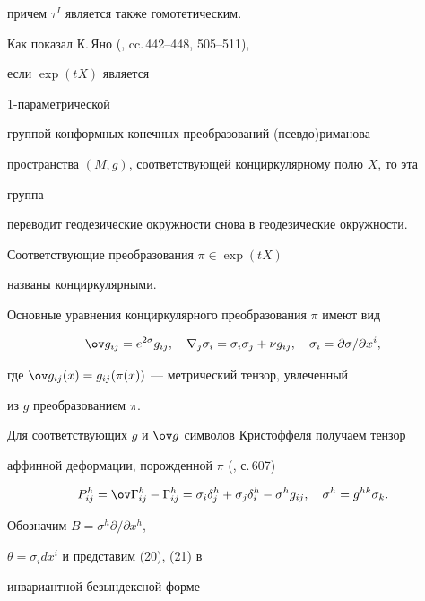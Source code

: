 причем $\tau^I$ является также гомотетическим.





Как показал К.\,Яно (\cite{7}, cc.\,442--448, 505--511),


если $\exp(t X)$ является


1-параметрической


группой конформных конечных преобразований (псевдо)риманова


пространства $(M,g)$, соответствующей конциркулярному полю $X$, то эта


группа


переводит геодезические окружности снова в геодезические окружности.


Соответствующие преобразования $\pi\in\exp(t X)$


названы конциркулярными.


Основные уравнения конциркулярного преобразования $\pi$ имеют вид


\begin{equation}


\ov g_{ij}=e^{2\sigma}g_{ij},\quad


\nabla_j\sigma_i=\sigma_i\sigma_j+\nu g_{ij},\quad


\sigma_i=\partial\sigma/\partial x^i,


\end{equation}


где $\ov g_{ij}(x)=g_{ij}(\pi(x))$ --- метрический тензор, увлеченный


из $g$ преобразованием $\pi$.





Для соответствующих $g$ и $\ov g$ символов Кристоффеля получаем тензор


аффинной деформации, порожденной $\pi$ (\cite{4}, с.\,607)


\begin{equation}


P^h_{ij}=\ov\Gamma^h_{ij}-\Gamma^h_{ij}=


\sigma_i\delta^h_j+\sigma_j\delta^h_i-\sigma^h g_{ij},\quad


\sigma^h=g^{hk}\sigma_k.


\end{equation}


Обозначим $B=\sigma^h\partial/\partial x^h$,


$\theta=\sigma_i dx^i$ и представим (20), (21) в


инвариантной безындексной форме


